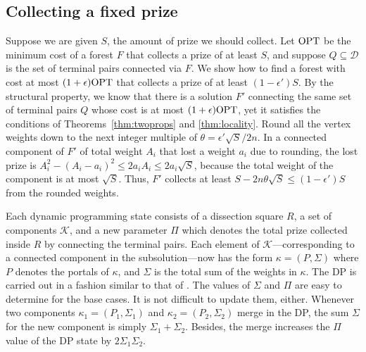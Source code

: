 \documentclass[extras,11pt]{article} \usepackage{fullpage}
\theoremstyle{mytheorem}
\newcommand{\eps}{\epsilon}
\newcommand{\DD}{\mathcal{D}}
\newcommand{\OPT}{\mbox{\rm OPT}}
\begin{document}
\subsection{Collecting a fixed prize}
\label{sec:smpcsf}

Suppose we are given $S$, the amount of prize we should collect.
Let $\OPT$ be the minimum cost of a forest $F$ that collects a prize of at least $S$,
and suppose $Q\subseteq\DD$ is the set of terminal pairs connected via $F$.
We show how to find a forest with cost at most $(1+\eps)\OPT$  that collects
a prize of at least $(1-\eps')S$.
By the structural property, we know that there is a solution $F'$ connecting the same
 set of terminal pairs $Q$ whose cost is at most $(1+\eps)\OPT$, yet it satisfies the
 conditions of Theorems~\ref{thm:twoprops} and \ref{thm:locality}.
Round all the vertex weights down to the next integer multiple of
$\theta=\eps' \sqrt S/2n$.
In a connected component of $F'$ of total weight $A_i$ that  lost a weight $a_i$ due to
rounding, the lost prize is $A_i^2-(A_i-a_i)^2 \leq 2a_iA_i\leq 2a_i\sqrt S$,
because the total weight of the component is at most $\sqrt S$.
Thus, $F'$ collects at least $S - 2n\theta\sqrt S \leq (1-\eps')S$ from the rounded weights.





Each dynamic programming state consists of a dissection square $R$,
a set of components $\mathcal{K}$, and a new parameter $\Pi$
which denotes the total prize collected inside $R$ by connecting
the terminal pairs.
Each element of $\mathcal{K}$---corresponding to a connected component in the subsolution---now has the form $\kappa=(P, \Sigma)$
where $P$ denotes the portals of $\kappa$, 
and $\Sigma$ is the total sum of the weights in $\kappa$.
The DP is carried out in a fashion similar to that of \cite{arora98:ptas}.
The values of $\Sigma$ and $\Pi$ are easy to determine for the base cases.
It is not difficult to update them, either.
Whenever two components $\kappa_1=(P_1, \Sigma_1)$ and $\kappa_2=(P_2, \Sigma_2)$
merge in the DP, the sum $\Sigma$ for the new component is simply $\Sigma_1+\Sigma_2$.
Besides, the merge increases the $\Pi$ value of the DP state by $2\Sigma_1\Sigma_2$.



\iffalse
Each dynamic programming state consists of a dissection square $R$, a configuration
$\chi=(\mathcal{K},\mathcal{P})$, and a new parameter $\Pi$ which denotes the total
 prize collected inside $R$ by connecting the terminal pairs.
In addition, each element of $\mathcal{K}$ now has the form $\kappa=(P, M, \Sigma)$,
where $\Sigma$ is the total sum of the weights in $\kappa$.
The values of $\Sigma$ and $\Pi$ are easy to determine for the base cases.
It is not difficult to update them either.
Whenever two components $\kappa_1=(P_1, M_1, \Sigma_1)$ and $\kappa_2=(P_2, M_2, \Sigma_2)$
merge in the DP, the sum $\Sigma$ for the new component is simply $\Sigma_1+\Sigma_2$.
Besides, the merge increases the $\Pi$ value of the DP state by $2\Sigma_1\Sigma_2$.
\fi
\end{document}
